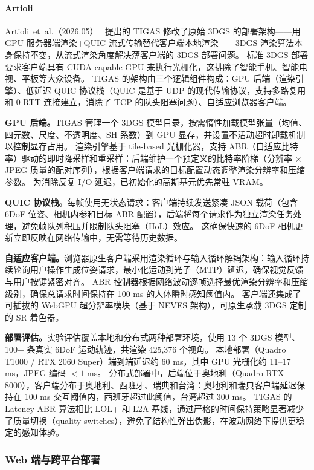 \paragraph{Artioli}
Artioli~et~al.（2026.05）~\cite{2605_08699} 提出的 TIGAS 修改了原始 3DGS 的部署架构——用 GPU 服务器端渲染+QUIC 流式传输替代客户端本地渲染——3DGS 渲染算法本身保持不变，从流式渲染角度解决薄客户端的 3DGS 部署问题。
标准 3DGS 部署要求客户端具有 CUDA-capable GPU 来执行光栅化，这排除了智能手机、智能电视、平板等大众设备。
TIGAS 的架构由三个逻辑组件构成：GPU 后端（渲染引擎）、低延迟 QUIC 协议栈（QUIC 是基于 UDP 的现代传输协议，支持多路复用和 0-RTT 连接建立，消除了 TCP 的队头阻塞问题）、自适应浏览器客户端。

\textbf{GPU 后端。}TIGAS 管理一个 3DGS 模型目录，按需惰性加载模型张量（均值、四元数、尺度、不透明度、SH 系数）到 GPU 显存，并设置不活动超时卸载机制以控制显存占用。
渲染引擎基于 tile-based 光栅化器，支持 ABR（自适应比特率）驱动的即时降采样和重采样：后端维护一个预定义的比特率阶梯（分辨率 $\times$ JPEG 质量的配对序列），根据客户端请求的目标配置动态调整渲染分辨率和压缩参数。
为消除反复 I/O 延迟，已初始化的高斯基元优先常驻 VRAM。

\textbf{QUIC 协议栈。}每帧使用无状态请求：客户端持续发送紧凑 JSON 载荷（包含 6DoF 位姿、相机内参和目标 ABR 配置），后端将每个请求作为独立渲染任务处理，避免帧队列积压并限制队头阻塞（HoL）效应。
这确保快速的 6DoF 相机更新立即反映在网络传输中，无需等待历史数据。

\textbf{自适应客户端。}浏览器原生客户端采用渲染循环与输入循环解耦架构：输入循环持续轮询用户操作生成位姿请求，最小化运动到光子（MTP）延迟，确保视觉反馈与用户按键紧密对齐。
ABR 控制器根据网络波动逐帧选择最优渲染分辨率和压缩级别，确保总请求时间保持在 100 ms 的人体瞬时感知阈值内。
客户端还集成了可插拔的 WebGPU 超分辨率模块（基于 NEVES 架构），可原生承载 3DGS 定制的 SR 着色器。

\textbf{部署评估。}实验评估覆盖本地和分布式两种部署环境，使用 13 个 3DGS 模型、100+ 条真实 6DoF 运动轨迹，共渲染 425,376 个视角。
本地部署（Quadro T1000 / RTX 2060 Super）端到端延迟约 60 ms，其中 GPU 光栅化约 11--17 ms，JPEG 编码 $< 1$ ms。
分布式部署中，后端位于奥地利（Quadro RTX 8000），客户端分布于奥地利、西班牙、瑞典和台湾：奥地利和瑞典客户端延迟保持在 100 ms 交互阈值内，西班牙超过此阈值，台湾超过 300 ms。
TIGAS 的 Latency ABR 算法相比 LOL+ 和 L2A 基线，通过严格的时间保持策略显著减少了质量切换（quality switches），避免了结构性弹出伪影，在波动网络下提供更稳定的感知体验。

\subsubsection{Web 端与跨平台部署}

